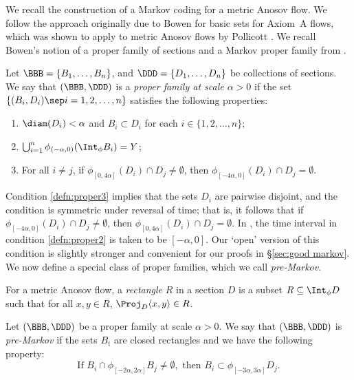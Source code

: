 We recall the construction of a Markov coding for a metric Anosov flow. We follow the approach originally due to Bowen \cite{bowen-symbolic} for basic sets for Axiom~A flows, which was shown to apply to metric Anosov flows by Pollicott \cite{pollicott}. We recall Bowen's notion of a proper family of sections and a Markov proper family from \cite{bowen-symbolic}.

\begin{defn}\label{defn:proper}
Let $\BBB=\{B_1, \ldots, B_n\}$, and $\DDD=\{D_1, \ldots, D_n\}$ be collections of sections. We say that $(\BBB, \DDD)$ is a \emph{proper family at scale $\alpha>0$} if the set \hbox{$\{ (B_i, D_i) \sep i = 1, 2, \ldots, n \}$} satisfies the following properties:
\begin{enumerate}
\item\label{defn:proper1} $\diam(D_i)< \alpha$ and $B_i \subset D_i$ for each $i \in \{1, 2, \ldots, n\}$;
\item\label{defn:proper2} $\bigcup_{i=1}^n\phi_{(-\alpha, 0)} (\Int_\phi B_i)=Y$;
\item\label{defn:proper3} For all $i\neq j$, if $\phi_{[0, 4\alpha]}(D_i) \cap D_j \neq \emptyset$, then $\phi_{[-4\alpha, 0]}(D_i) \cap D_j = \emptyset$.
\end{enumerate}
\end{defn}

Condition \eqref{defn:proper3} implies that the sets $D_i$ are pairwise disjoint, and the condition is symmetric under reversal of time; that is, it follows that if $\phi_{[-4\alpha, 0]}(D_i) \cap D_j \neq \emptyset$, then $\phi_{[0, 4\alpha]}(D_i) \cap D_j = \emptyset$. In \cite{bowen-symbolic, pollicott}, the time interval in condition \eqref{defn:proper2} is taken to be $[-\alpha, 0]$. Our `open' version of this condition is slightly stronger and convenient for our proofs in \S\ref {sec:good markov}. We now define a special class of proper families, which we call \emph{pre-Markov}.

\begin{defn}\label{def:rectangle}
For a metric Anosov flow, a \emph{rectangle} $R$ in a section $D$ is a subset $R \subseteq \Int_\phi D$ such that for all $x,y \in R$, $\Proj_{D} \langle x,y\rangle \in R$.
\end{defn}

\begin{defn}\label{defn:pollicott}
Let $(\BBB, \DDD)$ be a proper family at scale $\alpha>0$. We say that $(\BBB, \DDD)$ is \emph{pre-Markov} if the sets $B_i$ are closed rectangles and we have the following property:
\begin{equation} \label{premarkov}
\mbox{If }B_i \cap \phi_{[-2 \alpha, 2 \alpha]}B_j \neq \emptyset, \mbox{ then } B_i \subset \phi_{[-3\alpha, 3\alpha]} D_j.
\end{equation}
\end{defn}

